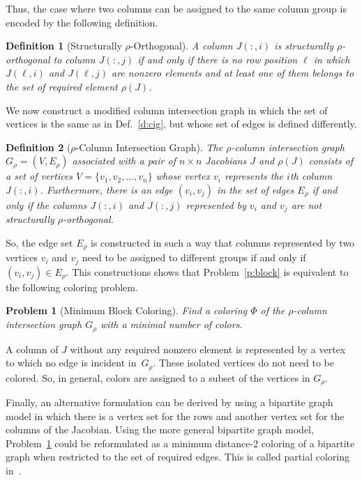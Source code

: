 \documentclass[12pt, twoside]{book}
\newtheorem{problem}{Problem}
\newtheorem{definition}{Definition}
\newcommand{\sparsifysymbol}{\ensuremath{\rho}}
\newcommand{\sparsify}[1]{\ensuremath{\sparsifysymbol(#1)}}
\begin{document}
Thus, the case where two columns can be assigned to the same column group is encoded by
the following definition.

\begin{definition}[Structurally $\sparsifysymbol$-Orthogonal]
A column $J(:,i)$ is structurally $\sparsifysymbol$-orthogonal to column $J(:,j)$ if and
only if there is no row position $\ell$ in which $J(\ell,i)$ and $J(\ell,j)$ are nonzero
elements and at least one of them belongs to the set of required element \sparsify{J}.
\end{definition}

We now construct a modified column intersection graph in which the set of vertices is the
same as in Def.~\ref{d:cig}, but whose set of edges is defined differently.
%
\begin{definition}[$\sparsifysymbol$-Column Intersection Graph]
\label{d.part.cig}
The $\sparsifysymbol$-column intersection graph $G_\sparsifysymbol =
(V,E_\sparsifysymbol)$ associated with a pair of $n \times n$ Jacobians $J$ and
\sparsify{J} consists of a set of vertices $V=\{v_1, v_2, \dots, v_n\}$ whose vertex
$v_i$ represents the $i$th column $J(:,i)$. Furthermore, there is an edge $(v_i,v_j)$ in
the set of edges $E_\sparsifysymbol$ if and only if the columns $J(:,i)$ and $J(:,j)$
represented by $v_i$ and $v_j$ are not structurally $\sparsifysymbol$-orthogonal.
\end{definition}

So, the edge set $E_\sparsifysymbol$ is constructed in such a way that columns
represented by two vertices $v_i$ and $v_j$ need to be assigned to different groups if
and only if $(v_i, v_j) \in E_\sparsifysymbol$. This constructions shows that
Problem~\ref{p:block} is equivalent to the following coloring problem.
%
\begin{problem}[Minimum Block Coloring]
\label{p:minblockcol}
%
Find a coloring $\Phi$ of the $\sparsifysymbol$-column intersection graph
$G_\sparsifysymbol$ with a minimal number of colors.
\end{problem}

A column of $J$ without any required nonzero element is represented by a vertex to which
no edge is incident in~$G_\sparsifysymbol$. These isolated vertices do not need to be
colored. So, in general, colors are assigned to a subset of the vertices in
$G_\sparsifysymbol$.

Finally, an alternative formulation can be derived by using a bipartite graph model in
which there is a vertex set for the rows and another vertex set for the columns of the
Jacobian. Using the more general bipartite graph model, Problem~\ref{p:minblockcol} could
be reformulated as a minimum distance-2 coloring of a bipartite graph when restricted to
the set of required edges. This is called partial coloring in~\cite{Gebremedhin05whatcolor}.
\end{document}
